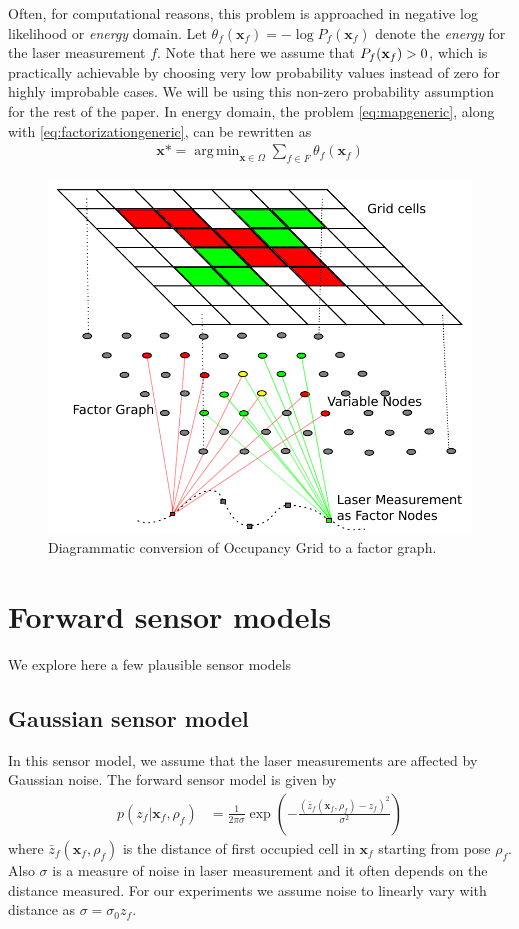 \documentclass[letterpaper, 10 pt, conference]{ieeeconf} %
\DeclareMathOperator*{\argmin}{arg\,min}
\newcommand{\vect}[1]{\mathbf{#1}}
\begin{document}
Often, for computational reasons, this problem is approached in negative log
likelihood or \emph{energy} domain. Let 
$\theta_f(\vect{x}_f) = - \log P_f(\vect{x}_f)$ 
denote the \emph{energy} for the laser measurement $f$. Note that here we
assume that $P_f(\map_f) > 0$, which is practically achievable by
choosing very low probability values instead of zero for highly improbable
cases. We will be using this non-zero probability assumption for the rest of the paper. 
In energy domain, the problem \eqref{eq:mapgeneric}, along with
\eqref{eq:factorizationgeneric}, can be rewritten as
\begin{align}
  \vect{x}* = \argmin_{\vect{x} \in \Omega} \sum_{f \in F} \theta_f(\vect{x}_f)
\end{align}
\begin{figure}
  \includegraphics[width=\columnwidth]{../figures/factorgraph/factorgraph.pdf}
  \caption{Diagrammatic conversion of Occupancy Grid to a factor graph.}
  \label{fig:factor-graph}
\end{figure}

\section{Forward sensor models}
We explore here a few plausible sensor models
\subsection{Gaussian sensor model}
\newcommand{\actz}{\bar{z}_f(\vect{x}_f, \rho_f)}
In this sensor model, we assume that the laser measurements are affected by Gaussian noise. The forward sensor model is given by
\begin{align}
  p(z_f|\vect{x}_f, \rho_f) &= \frac{1}{2\pi\sigma}\exp\left(-\frac{(\actz - z_f)^2}{\sigma^2}\right)
\end{align}
where $\actz$ is the distance of first occupied cell in $\vect{x}_f$ starting from pose $\rho_f$. Also $\sigma$ is a measure of noise in laser measurement and it often depends on the distance measured. For our experiments we assume noise to linearly vary with distance as $\sigma = \sigma_0z_f$. 
\end{document}
